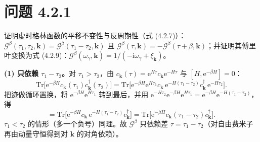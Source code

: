 \section*{问题 4.2.1}
\begin{problem}
证明虚时格林函数的平移不变性与反周期性（式 (4.2.7)）：$\mathcal{G}^\beta(\tau_1,\tau_2,\pmb{k})=\mathcal{G}^\beta(\tau_1-\tau_2,\pmb{k})$ 且 $\mathcal{G}^\beta(\tau,\pmb{k})=-\mathcal{G}^\beta(\tau+\beta,\pmb{k})$；并证明其傅里叶变换为式 (4.2.9)：$\mathcal{G}^\beta(\omega_\gamma,\pmb{k})=1/(-\mathrm{i}\omega_\gamma+\xi_{\pmb{k}})$。
\end{problem}
\solution
\textbf{(1) 只依赖 $\tau_1-\tau_2$。}对 $\tau_1>\tau_2$，由 $c_{\pmb{k}}(\tau)=\mathrm{e}^{H\tau}c_{\pmb{k}}\mathrm{e}^{-H\tau}$ 与 $[H,\mathrm{e}^{-\beta H}]=0$：
\begin{equation*}
\mathrm{Tr}\big[\mathrm{e}^{-\beta H}c_{\pmb{k}}(\tau_1)c^\dagger_{\pmb{k}}(\tau_2)\big]
=\mathrm{Tr}\big[\mathrm{e}^{-\beta H}\mathrm{e}^{H\tau_1}c_{\pmb{k}}\,\mathrm{e}^{-H(\tau_1-\tau_2)}c^\dagger_{\pmb{k}}\,\mathrm{e}^{-H\tau_2}\big].
\end{equation*}
把迹做循环置换，将 $\mathrm{e}^{-\beta H}\mathrm{e}^{H\tau_1}$ 转到最后，并用 $\mathrm{e}^{-H\tau_2}\mathrm{e}^{-\beta H}\mathrm{e}^{H\tau_1}=\mathrm{e}^{-\beta H}\mathrm{e}^{-H(\tau_1-\tau_2)}$，得
\begin{equation*}
=\mathrm{Tr}\big[\mathrm{e}^{-\beta H}c_{\pmb{k}}\,\mathrm{e}^{-H(\tau_1-\tau_2)}c^\dagger_{\pmb{k}}\big]
=\mathrm{Tr}\big[\mathrm{e}^{-\beta H}c_{\pmb{k}}(\tau_1-\tau_2)c^\dagger_{\pmb{k}}\big].
\end{equation*}
$\tau_1<\tau_2$ 的情形（多一个负号）同理。故 $\mathcal{G}^\beta$ 只依赖差 $\tau=\tau_1-\tau_2$（对自由费米子再由动量守恒得到对 $\pmb{k}$ 的对角依赖）。

